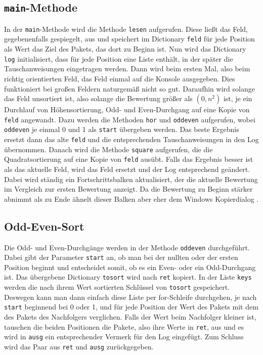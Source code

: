 \documentclass[12pt]{article}
\begin{document}
\subsection{\texttt{main}-Methode}
In der \texttt{main}-Methode wird die Methode \texttt{lesen} aufgerufen. Diese ließt das Feld, gegebenenfalls gespiegelt, aus und speichert im Dictionary \texttt{feld} für jede Position als Wert das Ziel des Pakets, das dort zu Beginn ist. Nun wird das Dictionary \texttt{log} initialisiert, dass für jede Position eine Liste enthält, in der später die Tauschanweisungen eingetragen werden. Dann wird beim ersten Mal, also beim richtig orientierten Feld, das Feld einmal auf die Konsole ausgegeben. Dies funktioniert bei großen Feldern naturgemäß nicht so gut. Daraufhin wird solange das Feld unsortiert ist, also solange die Bewertung größer als $(0,n^2)$ ist, je ein Durchlauf von Höhensortierung, Odd- und Even-Durchgang auf eine Kopie von \texttt{feld} angewandt. Dazu werden die Methoden \texttt{hor} und \texttt{oddeven} aufgerufen, wobei \texttt{oddeven} je einmal 0 und 1 als \texttt{start} übergeben werden. Das beste Ergebnis ersetzt dann das alte \texttt{feld} und die entsprechenden Tauschanweisungen in den Log übernommen. Danach wird die Methode \texttt{square} aufgerufen, die die Quadratsortierung auf eine Kopie von \texttt{feld} ausübt. Falls das Ergebnis besser ist als das aktuelle Feld, wird das Feld ersetzt und der Log entsprechend geändert. Dabei wird ständig ein Fortschrittsbalken aktualisiert, der die aktuelle Bewertung im Vergleich zur ersten Bewertung anzeigt. Da die Bewertung zu Beginn stärker abnimmt als zu Ende ähnelt dieser Balken aber eher dem Windows Kopierdialog \cite{4}.
\subsection{Odd-Even-Sort}
Die Odd- und Even-Durchgänge werden in der Methode \texttt{oddeven} durchgeführt. Dabei gibt der Parameter \texttt{start} an, ob man bei der nullten oder der ersten Position beginnt und entscheidet somit, ob es ein Even- oder ein Odd-Durchgang ist. Das übergebene Dictionary \texttt{tosort} wird nach \texttt{ret} kopiert. In der Liste \texttt{keys} werden die nach ihrem Wert sortierten Schlüssel von \texttt{tosort} gespeichert. Deswegen kann man dann einfach diese Liste per for-Schleife durchgehen, je nach \texttt{start} beginnend bei 0 oder 1, und für jede Position der Wert des Pakets mit dem des Pakets des Nachfolgers verglichen. Falls der Wert beim Nachfolger kleiner ist, tauschen die beiden Positionen die Pakete, also ihre Werte in \texttt{ret}, aus und es wird in \texttt{ausg} ein entsprechender Vermerk für den Log eingefügt. Zum Schluss wird das Paar aus \texttt{ret} und \texttt{ausg} zurückgegeben. 
\end{document}
